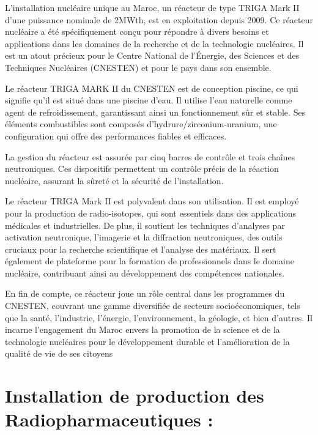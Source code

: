 \documentclass{report}
\newenvironment{mystyle}{
	\setlength{\parindent}{0pt} %
	\setlength{\parskip}{10pt} %
	\fontsize{12pt}{14pt}\selectfont %
}{
}
\begin{document}
	\begin{mystyle} 	L'installation nucléaire unique au Maroc, un réacteur de type TRIGA Mark II d'une puissance nominale de 2MWth, est en exploitation depuis 2009. Ce réacteur nucléaire a été spécifiquement conçu pour répondre à divers besoins et applications dans les domaines de la recherche et de la technologie nucléaires. Il est un atout précieux pour le Centre National de l’Énergie, des Sciences et des Techniques Nucléaires (CNESTEN) et pour le pays dans son ensemble.
	
	Le réacteur TRIGA MARK II du CNESTEN est de conception piscine, ce qui signifie qu'il est situé dans une piscine d'eau. Il utilise l'eau naturelle comme agent de refroidissement, garantissant ainsi un fonctionnement sûr et stable. Ses éléments combustibles sont composés d'hydrure/zirconium-uranium, une configuration qui offre des performances fiables et efficaces.
	
	La gestion du réacteur est assurée par cinq barres de contrôle et trois chaînes neutroniques. Ces dispositifs permettent un contrôle précis de la réaction nucléaire, assurant la sûreté et la sécurité de l'installation.
	
	Le réacteur TRIGA Mark II est polyvalent dans son utilisation. Il est employé pour la production de radio-isotopes, qui sont essentiels dans des applications médicales et industrielles. De plus, il soutient les techniques d'analyses par activation neutronique, l'imagerie et la diffraction neutroniques, des outils cruciaux pour la recherche scientifique et l'analyse des matériaux. Il sert également de plateforme pour la formation de professionnels dans le domaine nucléaire, contribuant ainsi au développement des compétences nationales.
	
	En fin de compte, ce réacteur joue un rôle central dans les programmes du CNESTEN, couvrant une gamme diversifiée de secteurs socioéconomiques, tels que la santé, l'industrie, l'énergie, l'environnement, la géologie, et bien d'autres. Il incarne l'engagement du Maroc envers la promotion de la science et de la technologie nucléaires pour le développement durable et l'amélioration de la qualité de vie de ses citoyens
	\end{mystyle}
	
	\section{Installation de production des Radiopharmaceutiques :}
	
\end{document}
